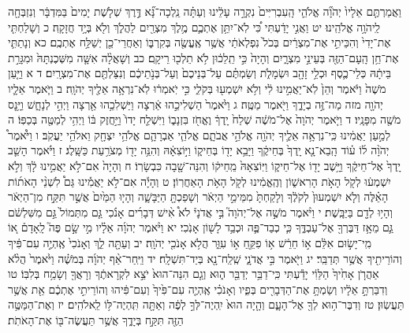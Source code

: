 \documentclass[twoside, openany, parskip=half, 11pt]{book}
\begin{document}
וַאֲמַרְתֶּ֤ם אֵלָיו֙ יְהֹוָ֞ה אֱלֹהֵ֤י הָֽעִבְרִיִּים֙ נִקְרָ֣ה עָלֵ֔ינוּ וְעַתָּ֗ה נֵֽלְכָה־נָּ֞א דֶּ֣רֶךְ שְׁלֹ֤שֶׁת יָמִים֙ בַּמִּדְבָּ֔ר וְנִזְבְּחָ֖ה לַֽיהֹוָ֥ה אֱלֹהֵֽינוּ׃ יט וַאֲנִ֣י יָדַ֔עְתִּי כִּ֠י לֹֽא־יִתֵּ֥ן אֶתְכֶ֛ם מֶ֥לֶךְ מִצְרַ֖יִם לַהֲלֹ֑ךְ וְלֹ֖א בְּיָ֥ד חֲזָקָֽה׃ כ וְשָׁלַחְתִּ֤י אֶת־יָדִי֙ וְהִכֵּיתִ֣י אֶת־מִצְרַ֔יִם בְּכֹל֙ נִפְלְאֹתַ֔י אֲשֶׁ֥ר אֶֽעֱשֶׂ֖ה בְּקִרְבּ֑וֹ וְאַחֲרֵי־כֵ֖ן יְשַׁלַּ֥ח אֶתְכֶֽם׃ כא וְנָתַתִּ֛י אֶת־חֵ֥ן הָֽעָם־הַזֶּ֖ה בְּעֵינֵ֣י מִצְרָ֑יִם וְהָיָה֙ כִּ֣י תֵֽלֵכ֔וּן לֹ֥א תֵלְכ֖וּ רֵיקָֽם׃ כב וְשָׁאֲלָ֨ה אִשָּׁ֤ה מִשְּׁכֶנְתָּהּ֙ וּמִגָּרַ֣ת בֵּיתָ֔הּ כְּלֵי־כֶ֛סֶף וּכְלֵ֥י זָהָ֖ב וּשְׂמָלֹ֑ת וְשַׂמְתֶּ֗ם עַל־בְּנֵיכֶם֙ וְעַל־בְּנֹ֣תֵיכֶ֔ם וְנִצַּלְתֶּ֖ם אֶת־מִצְרָֽיִם׃ ד א וַיַּ֤עַן מֹשֶׁה֙ וַיֹּ֔אמֶר וְהֵן֙ לֹֽא־יַאֲמִ֣ינוּ לִ֔י וְלֹ֥א יִשְׁמְע֖וּ בְּקֹלִ֑י כִּ֣י יֹֽאמְר֔וּ לֹֽא־נִרְאָ֥ה אֵלֶ֖יךָ יְהֹוָֽה׃ ב וַיֹּ֧אמֶר אֵלָ֛יו יְהֹוָ֖ה מזה מַה־זֶּ֣ה בְיָדֶ֑ךָ וַיֹּ֖אמֶר מַטֶּֽה׃ ג וַיֹּ֙אמֶר֙ הַשְׁלִיכֵ֣הוּ אַ֔רְצָה וַיַּשְׁלִכֵ֥הוּ אַ֖רְצָה וַיְהִ֣י לְנָחָ֑שׁ וַיָּ֥נׇס מֹשֶׁ֖ה מִפָּנָֽיו׃ ד וַיֹּ֤אמֶר יְהֹוָה֙ אֶל־מֹשֶׁ֔ה שְׁלַח֙ יָֽדְךָ֔ וֶאֱחֹ֖ז בִּזְנָב֑וֹ וַיִּשְׁלַ֤ח יָדוֹ֙ וַיַּ֣חֲזֶק בּ֔וֹ וַיְהִ֥י לְמַטֶּ֖ה בְּכַפּֽוֹ׃ ה לְמַ֣עַן יַאֲמִ֔ינוּ כִּֽי־נִרְאָ֥ה אֵלֶ֛יךָ יְהֹוָ֖ה אֱלֹהֵ֣י אֲבֹתָ֑ם אֱלֹהֵ֧י אַבְרָהָ֛ם אֱלֹהֵ֥י יִצְחָ֖ק וֵאלֹהֵ֥י יַעֲקֹֽב׃ ו וַיֹּ֩אמֶר֩ יְהֹוָ֨ה ל֜וֹ ע֗וֹד הָֽבֵא־נָ֤א יָֽדְךָ֙ בְּחֵיקֶ֔ךָ וַיָּבֵ֥א יָד֖וֹ בְּחֵיק֑וֹ וַיּ֣וֹצִאָ֔הּ וְהִנֵּ֥ה יָד֖וֹ מְצֹרַ֥עַת כַּשָּֽׁלֶג׃ ז וַיֹּ֗אמֶר הָשֵׁ֤ב יָֽדְךָ֙ אֶל־חֵיקֶ֔ךָ וַיָּ֥שֶׁב יָד֖וֹ אֶל־חֵיק֑וֹ וַיּֽוֹצִאָהּ֙ מֵֽחֵיק֔וֹ וְהִנֵּה־שָׁ֖בָה כִּבְשָׂרֽוֹ׃ ח וְהָיָה֙ אִם־לֹ֣א יַאֲמִ֣ינוּ לָ֔ךְ וְלֹ֣א יִשְׁמְע֔וּ לְקֹ֖ל הָאֹ֣ת הָרִאשׁ֑וֹן וְהֶֽאֱמִ֔ינוּ לְקֹ֖ל הָאֹ֥ת הָאַחֲרֽוֹן׃ ט וְהָיָ֡ה אִם־לֹ֣א יַאֲמִ֡ינוּ גַּם֩ לִשְׁנֵ֨י הָאֹת֜וֹת הָאֵ֗לֶּה וְלֹ֤א יִשְׁמְעוּן֙ לְקֹלֶ֔ךָ וְלָקַחְתָּ֙ מִמֵּימֵ֣י הַיְאֹ֔ר וְשָׁפַכְתָּ֖ הַיַּבָּשָׁ֑ה וְהָי֤וּ הַמַּ֙יִם֙ אֲשֶׁ֣ר תִּקַּ֣ח מִן־הַיְאֹ֔ר וְהָי֥וּ לְדָ֖ם בַּיַּבָּֽשֶׁת׃ י וַיֹּ֨אמֶר מֹשֶׁ֣ה אֶל־יְהֹוָה֮ בִּ֣י אֲדֹנָי֒ לֹא֩ אִ֨ישׁ דְּבָרִ֜ים אָנֹ֗כִי גַּ֤ם מִתְּמוֹל֙ גַּ֣ם מִשִּׁלְשֹׁ֔ם גַּ֛ם מֵאָ֥ז דַּבֶּרְךָ֖ אֶל־עַבְדֶּ֑ךָ כִּ֧י כְבַד־פֶּ֛ה וּכְבַ֥ד לָשׁ֖וֹן אָנֹֽכִי׃ יא וַיֹּ֨אמֶר יְהֹוָ֜ה אֵלָ֗יו מִ֣י שָׂ֣ם פֶּה֮ לָֽאָדָם֒ א֚וֹ מִֽי־יָשׂ֣וּם אִלֵּ֔ם א֣וֹ חֵרֵ֔שׁ א֥וֹ פִקֵּ֖חַ א֣וֹ עִוֵּ֑ר הֲלֹ֥א אָנֹכִ֖י יְהֹוָֽה׃ יב וְעַתָּ֖ה לֵ֑ךְ וְאָנֹכִי֙ אֶֽהְיֶ֣ה עִם־פִּ֔יךָ וְהוֹרֵיתִ֖יךָ אֲשֶׁ֥ר תְּדַבֵּֽר׃ יג וַיֹּ֖אמֶר בִּ֣י אֲדֹנָ֑י שְֽׁלַֽח־נָ֖א בְּיַד־תִּשְׁלָֽח׃ יד וַיִּֽחַר־אַ֨ף יְהֹוָ֜ה בְּמֹשֶׁ֗ה וַיֹּ֙אמֶר֙ הֲלֹ֨א אַהֲרֹ֤ן אָחִ֙יךָ֙ הַלֵּוִ֔י יָדַ֕עְתִּי כִּֽי־דַבֵּ֥ר יְדַבֵּ֖ר ה֑וּא וְגַ֤ם הִנֵּה־הוּא֙ יֹצֵ֣א לִקְרָאתֶ֔ךָ וְרָאֲךָ֖ וְשָׂמַ֥ח בְּלִבּֽוֹ׃ טו וְדִבַּרְתָּ֣ אֵלָ֔יו וְשַׂמְתָּ֥ אֶת־הַדְּבָרִ֖ים בְּפִ֑יו וְאָנֹכִ֗י אֶֽהְיֶ֤ה עִם־פִּ֙יךָ֙ וְעִם־פִּ֔יהוּ וְהוֹרֵיתִ֣י אֶתְכֶ֔ם אֵ֖ת אֲשֶׁ֥ר תַּעֲשֽׂוּן׃ טז וְדִבֶּר־ה֥וּא לְךָ֖ אֶל־הָעָ֑ם וְהָ֤יָה הוּא֙ יִֽהְיֶה־לְּךָ֣ לְפֶ֔ה וְאַתָּ֖ה תִּֽהְיֶה־לּ֥וֹ לֵֽאלֹהִֽים׃ יז וְאֶת־הַמַּטֶּ֥ה הַזֶּ֖ה תִּקַּ֣ח בְּיָדֶ֑ךָ אֲשֶׁ֥ר תַּעֲשֶׂה־בּ֖וֹ אֶת־הָאֹתֹֽת׃
\end{document}
